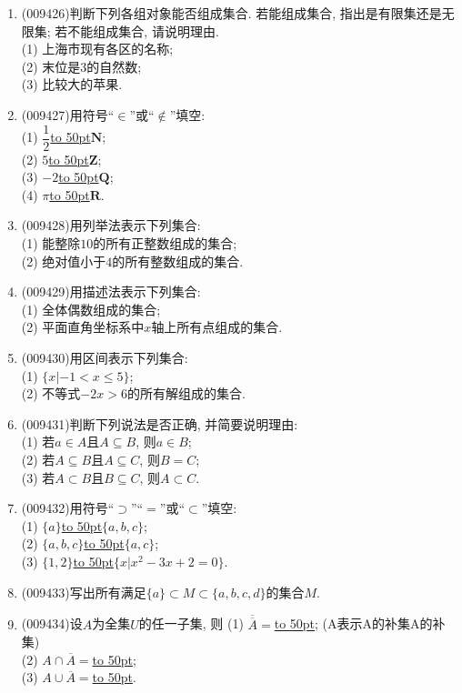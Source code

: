 \documentclass[10pt,a4paper]{article}
\newcommand{\blank}[1]{\underline{\hbox to #1pt{}}}
\begin{document}
\begin{enumerate}[1.]
\item {\tiny (009426)}判断下列各组对象能否组成集合. 若能组成集合, 指出是有限集还是无限集; 若不能组成集合, 请说明理由.\\
(1) 上海市现有各区的名称;\\
(2) 末位是$3$的自然数;\\
(3) 比较大的苹果.
\item {\tiny (009427)}用符号``$\in$''或``$\not\in$''填空:\\
(1) $\dfrac12$\blank{50}$\mathbf{N}$;\\
(2) $5$\blank{50}$\mathbf{Z}$;\\
(3) $-2$\blank{50}$\mathbf{Q}$;\\
(4) $\pi$\blank{50}$\mathbf{R}$.
\item {\tiny (009428)}用列举法表示下列集合:\\
(1) 能整除$10$的所有正整数组成的集合;\\
(2) 绝对值小于$4$的所有整数组成的集合.
\item {\tiny (009429)}用描述法表示下列集合:\\
(1) 全体偶数组成的集合;\\
(2) 平面直角坐标系中$x$轴上所有点组成的集合.
\item {\tiny (009430)}用区间表示下列集合:\\
(1) $\{x|-1<x\le 5\}$;\\
(2) 不等式$-2x>6$的所有解组成的集合.
\item {\tiny (009431)}判断下列说法是否正确, 并简要说明理由:\\
(1) 若$a\in A$且$A\subseteq B$, 则$a\in B$;\\
(2) 若$A\subseteq B$且$A\subseteq C$, 则$B=C$;\\
(3) 若$A\subset B$且$B\subseteq C$, 则$A\subset C$.
\item {\tiny (009432)}用符号``$\supset$''``$=$''或``$\subset$''填空:\\
(1) $\{a\}$\blank{50}$\{a, b, c\}$;\\
(2) $\{a, b, c\}$\blank{50}$\{a, c\}$;\\
(3) $\{1, 2\}$\blank{50}$\{x|x^2-3x+2=0\}$.
\item {\tiny (009433)}写出所有满足$\{a\}\subset M\subset \{a, b, c, d\}$的集合$M$.
\item {\tiny (009434)}设$A$为全集$U$的任一子集, 则
(1) $\overline{\overline{A}}=$\blank{50}; (A表示A的补集A的补集)\\
(2) $A\cap \overline A=$\blank{50};\\
(3) $A\cup \overline A=$\blank{50}.

\end{enumerate}
\end{document}
